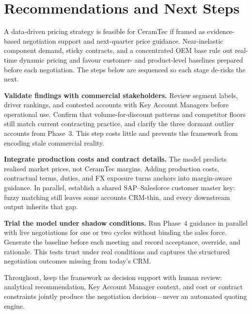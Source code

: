 \documentclass{article}
\begin{document}
\clearpage

\section{Recommendations and Next Steps}

A data-driven pricing strategy is feasible for CeramTec if framed as evidence-based negotiation support and next-quarter price guidance. Near-inelastic component demand, sticky contracts, and a concentrated OEM base rule out real-time dynamic pricing and favour customer- and product-level baselines prepared before each negotiation. The steps below are sequenced so each stage de-risks the next.

\vspace{0.4em}

\textbf{Validate findings with commercial stakeholders.} Review segment labels, driver rankings, and contested accounts with Key Account Managers before operational use. Confirm that volume-for-discount patterns and competitor floors still match current contracting practice, and clarify the three dormant outlier accounts from Phase~3. This step costs little and prevents the framework from encoding stale commercial reality.

\vspace{0.4em}

\textbf{Integrate production costs and contract details.} The model predicts realised market prices, not CeramTec margins. Adding production costs, contractual terms, duties, and FX exposure turns anchors into margin-aware guidance. In parallel, establish a shared SAP--Salesforce customer master key: fuzzy matching still leaves some accounts CRM-thin, and every downstream output inherits that gap.

\vspace{0.4em}

\textbf{Trial the model under shadow conditions.} Run Phase~4 guidance in parallel with live negotiations for one or two cycles without binding the sales force. Generate the baseline before each meeting and record acceptance, override, and rationale. This tests trust under real conditions and captures the structured negotiation outcomes missing from today's CRM.

\vspace{0.4em}

Throughout, keep the framework as decision support with human review: analytical recommendation, Key Account Manager context, and cost or contract constraints jointly produce the negotiation decision---never an automated quoting engine.
\end{document}
